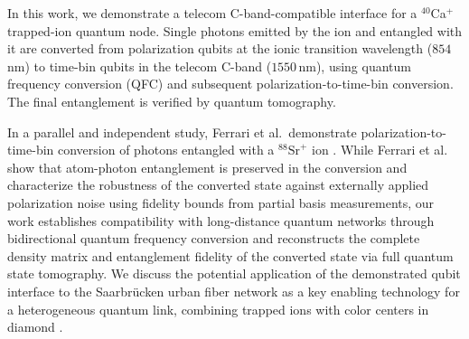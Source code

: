 \documentclass[reprint, superscriptaddress, longbibliography, floatfix, twocolumn, nofootinbib, amsmath, amssymb, aps, showkeys]{revtex4-2}
\begin{document}
In this work, we demonstrate a telecom C-band-compatible interface for a $^{40}$Ca$^+$ trapped-ion quantum node. 
Single photons emitted by the ion and entangled with it \cite{Bock_2018} are converted from polarization qubits at the ionic transition wavelength ($854\,$nm) to time-bin qubits in the telecom C-band ($1550\,$nm), using quantum frequency conversion (QFC) \cite{Arenskoetter_2023} and subsequent polarization-to-time-bin conversion. The final entanglement is verified by quantum tomography.  

In a parallel and independent study, Ferrari et al.\ demonstrate %
polarization-to-time-bin conversion of photons entangled with a $^{88}\mathrm{Sr}^{+}$ ion \cite{Ferrari_2026}. 
While Ferrari et al. show that atom-photon entanglement is preserved in the conversion and characterize the robustness of the converted state against externally applied polarization noise using fidelity bounds from partial basis measurements, our work establishes compatibility with long-distance quantum networks through bidirectional quantum frequency conversion and reconstructs the complete density matrix and entanglement fidelity of the converted state via full quantum state tomography. 
We discuss the potential application of the demonstrated qubit interface to the Saarbrücken urban fiber network \cite{Kucera_2024} as a key enabling technology for a heterogeneous quantum link, combining trapped ions with color centers in diamond \cite{Schaefer_2025, Herrmann_2026}.
\end{document}
